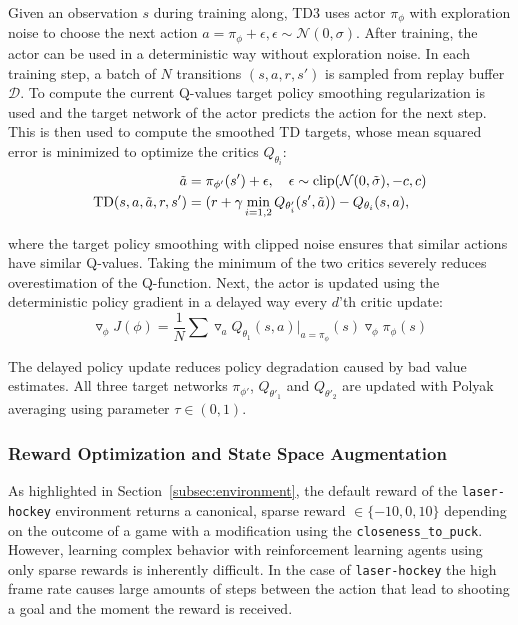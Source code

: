 Given an observation $s$ during training along, TD3 uses actor $\pi_{\phi}$ with exploration noise to choose the next action $a = \pi_{\phi} + \epsilon, \epsilon \sim \mathcal{N}(0, \sigma)$. After training, the actor can be used in a deterministic way without exploration noise. In each training step, a batch of $N$ transitions $(s, a, r, s')$ is sampled from replay buffer $\mathcal{D}$. To compute the current Q-values target policy smoothing regularization is used and the target network of the actor predicts the action for the next step. This is then used to compute the smoothed TD targets, whose mean squared error is minimized to optimize the critics $Q_{\theta_i}$:
\begin{align*}
    \Tilde{a} &= \pi_{\phi'}(s') + \epsilon, \quad \epsilon \sim \operatorname{clip}(\mathcal{N}(0, \Tilde{\sigma}), -c, c) \\
    \operatorname{TD}(s, a, \Tilde{a}, r, s') &= (r + \gamma \min_{i=1,2} Q_{\theta'_i}(s', \Tilde{a})) - Q_{\theta_i}(s, a),
\end{align*}

where the target policy smoothing with clipped noise ensures that similar actions have similar Q-values. Taking the minimum of the two critics severely reduces overestimation of the Q-function. Next, the actor is updated using the deterministic policy gradient in a delayed way every $d$'th critic update:
\begin{equation*}
    \triangledown_{\phi} J(\phi) = \frac{1}{N} \sum \triangledown_a Q_{\theta_1}(s,a)|_{a=\pi_{\phi}}(s) \triangledown_{\phi} \pi_{\phi}(s)
\end{equation*}

 The delayed policy update reduces policy degradation caused by bad value estimates. All three target networks $\pi_{\phi'}$, $Q_{\theta'_1}$ and $Q_{\theta'_2}$ are updated with Polyak averaging using parameter $\tau \in (0,1)$.

\subsubsection{Reward Optimization and State Space Augmentation}\label{subsubsec:state_space}

As highlighted in Section~\ref{subsec:environment}, the default reward of the \texttt{laser-hockey} environment returns a canonical, sparse reward $\in \{-10, 0, 10\}$ depending on the outcome of a game with a modification using the \texttt{closeness\_to\_puck}. However, learning complex behavior with reinforcement learning agents using only sparse rewards is inherently difficult. In the case of \texttt{laser-hockey} the high frame rate causes large amounts of steps between the action that lead to shooting a goal and the moment the reward is received. 

